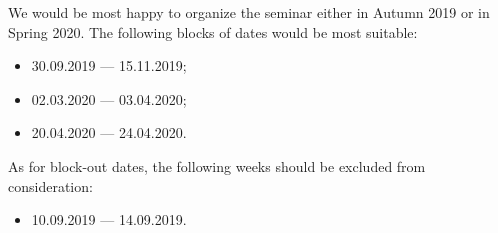 We would be most happy to organize the seminar either in Autumn 2019 or in Spring 2020. The following blocks of dates would be most suitable:
\begin{itemize}
\item 30.09.2019 --- 15.11.2019;
\item 02.03.2020 --- 03.04.2020;
\item 20.04.2020 --- 24.04.2020.
\end{itemize}
As for block-out dates, the following weeks should be excluded from consideration:
\begin{itemize}
\item 10.09.2019 --- 14.09.2019.
\end{itemize}
